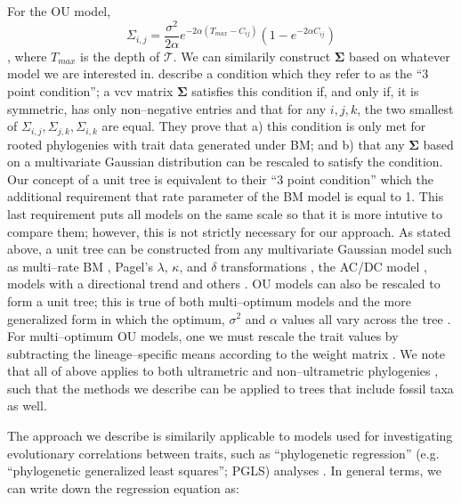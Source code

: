 \documentclass[a4paper,12pt]{article}
\begin{document}
For the OU model, 
\begin{equation}
\Sigma_{i,j} = \frac{\sigma^2}{2\alpha} e^{-2\alpha (T_{max} - C_{ij})} (1 - e^{-2\alpha C_{ij}})
\end{equation}
\citep{Hansen1997, ButlerKing2004}, where $T_{max}$ is the depth of $\mathcal{T}$.
We can similarily construct $\mathbf{\Sigma}$ based on whatever model we are interested in. \citet{HoAne2013} describe a condition which they refer to as the ``3 point condition''; a vcv matrix $\mathbf{\Sigma}$ satisfies this condition if, and only if, it is symmetric, has only non--negative entries and that for any $i,j,k$, the two smallest of $\Sigma_{i,j}, \Sigma_{j,k}, \Sigma_{i,k}$ are equal. They prove that a) this condition is only met for rooted phylogenies with trait data generated under BM; and b) that any $\mathbf{\Sigma}$ based on a multivariate Gaussian distribution can be rescaled to satisfy the condition. Our concept of a unit tree is equivalent to their ``3 point condition'' which the additional requirement that rate parameter of the BM model is equal to 1. This last requirement puts all models on the same scale so that it is more intutive to compare them; however, this is not strictly necessary for our approach. As stated above, a unit tree can be constructed from any multivariate Gaussian model such as multi--rate BM \citep{Omeara2006, Thomas2006, Eastman2011, Revell2012, Motmot}, Pagel's $\lambda$, $\kappa$, and $\delta$ transformations \citep{Pagel1997, Pagel1999}, the AC/DC model \citep{Blomberg2003} \citep[a.k.a. `EB';][]{Harmon2010, SlaterPennell}, models with a directional trend \citep{Hunt2007} and others \citep[e.g.][]{SlaterMEE}. OU models can also be rescaled to form a unit tree; this is true of both multi--optimum \citep{ButlerKing2004} models and the more generalized form \citep{Beaulieu2012, IngramMahler, UyedaBayou} in which the optimum, $\sigma^2$ and $\alpha$ values all vary across the tree \citep{HoAne2013}. For multi--optimum OU models, one we must rescale the trait values by subtracting the lineage--specific means according to the weight matrix \citep[see][]{Hansen1997, ButlerKing2004, Beaulieu2012}. We note that all of above applies to both ultrametric and non--ultrametric phylogenies \citep{HoAne2013}, such that the methods we describe can be applied to trees that include fossil taxa as well.

The approach we describe is similarily applicable to models used for investigating evolutionary correlations between traits, such as ``phylogenetic regression'' (e.g. ``phylogenetic generalized least squares''; PGLS) analyses \citep{Grafen1989, Rohlf2001}. In general terms, we can write down the regression equation as:
\end{document}
